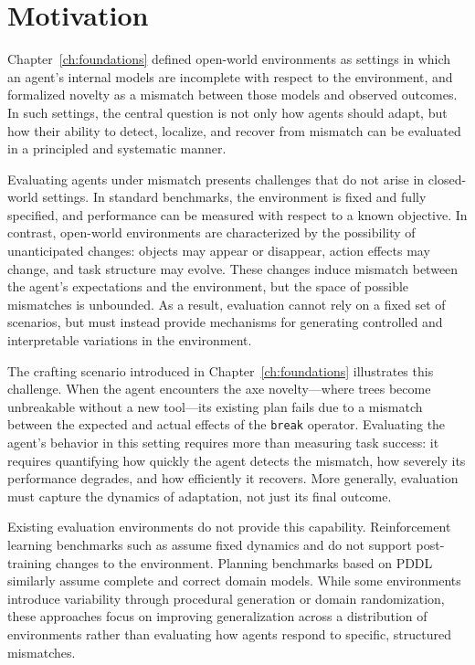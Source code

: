 \section{Motivation}
\label{sec:benchmarks_motivation}

Chapter~\ref{ch:foundations} defined open-world environments as settings in which an agent's internal models are incomplete with respect to the environment, and formalized novelty as a mismatch between those models and observed outcomes. In such settings, the central question is not only how agents should adapt, but how their ability to detect, localize, and recover from mismatch can be evaluated in a principled and systematic manner.

Evaluating agents under mismatch presents challenges that do not arise in closed-world settings. In standard benchmarks, the environment is fixed and fully specified, and performance can be measured with respect to a known objective. In contrast, open-world environments are characterized by the possibility of unanticipated changes: objects may appear or disappear, action effects may change, and task structure may evolve. These changes induce mismatch between the agent's expectations and the environment, but the space of possible mismatches is unbounded. As a result, evaluation cannot rely on a fixed set of scenarios, but must instead provide mechanisms for generating controlled and interpretable variations in the environment.

The crafting scenario introduced in Chapter~\ref{ch:foundations} illustrates this challenge. When the agent encounters the axe novelty---where trees become unbreakable without a new tool---its existing plan fails due to a mismatch between the expected and actual effects of the \texttt{break} operator. Evaluating the agent's behavior in this setting requires more than measuring task success: it requires quantifying how quickly the agent detects the mismatch, how severely its performance degrades, and how efficiently it recovers. More generally, evaluation must capture the dynamics of adaptation, not just its final outcome.

Existing evaluation environments do not provide this capability. Reinforcement learning benchmarks such as \citep{brockman2016openai, bellemare2013arcade} assume fixed dynamics and do not support post-training changes to the environment. Planning benchmarks based on PDDL \citep{mcdermott1998pddl} similarly assume complete and correct domain models. While some environments introduce variability through procedural generation or domain randomization, these approaches focus on improving generalization across a distribution of environments rather than evaluating how agents respond to specific, structured mismatches.

